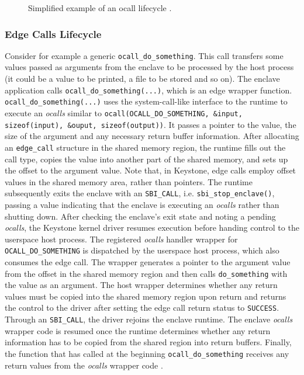 \begin{figure}[h!]
    \centering
    
    \caption{Simplified example of an ocall lifecycle \cite{keystone-doc}.}
    \label{ocall-lifecycle}
\end{figure}

\subsubsection{Edge Calls Lifecycle}
Consider for example a generic \texttt{ocall\_do\_something}. This call transfers some values passed as arguments from the enclave to be processed by the host process (it could be a value to be printed, a file to be stored and so on). The enclave application calls \texttt{ocall\_do\_something(...)}, which is an edge wrapper function.
\texttt{ocall\_do\_something(...)} uses the system-call-like interface to the runtime to execute an \textit{ocalls} similar to \texttt{ocall(OCALL\_DO\_SOMETHING, \&input, sizeof(input), \&ouput,  sizeof(output))}. It passes a pointer to the value, the size of the argument and any necessary return buffer information. 
After allocating an \texttt{edge\_call} structure in the shared memory region, the runtime fills out the call type, copies the value into another part of the shared memory, and sets up the offset to the argument value. Note that, in Keystone, edge calls employ offset values in the shared memory area, rather than pointers.
The runtime subsequently exits the enclave with an \texttt{SBI\_CALL}, i.e. \texttt{sbi\_stop\_enclave()}, passing a value indicating that the enclave is executing an \textit{ocalls} rather than shutting down. 
After checking the enclave's exit state and noting a pending \textit{ocalls}, the Keystone kernel driver resumes execution before handing control to the userspace host process. 
The registered \textit{ocalls} handler wrapper for \texttt{OCALL\_DO\_SOMETHING} is dispatched by the userspace host process, which also consumes the edge call. The wrapper generates a pointer to the argument value from the offset in the shared memory region and then calls \texttt{do\_something} with the value as an argument. The host wrapper determines whether any return values must be copied into the shared memory region upon return and returns the control to the driver after setting the edge call return status to \texttt{SUCCESS}. Through an \texttt{SBI\_CALL}, the driver rejoins the enclave runtime. The enclave \textit{ocalls} wrapper code is resumed once the runtime determines whether any return information has to be copied from the shared region into return buffers. Finally, the function that has called at the beginning \texttt{ocall\_do\_something} receives any return values from the \textit{ocalls} wrapper code \cite{keystone-doc}.


